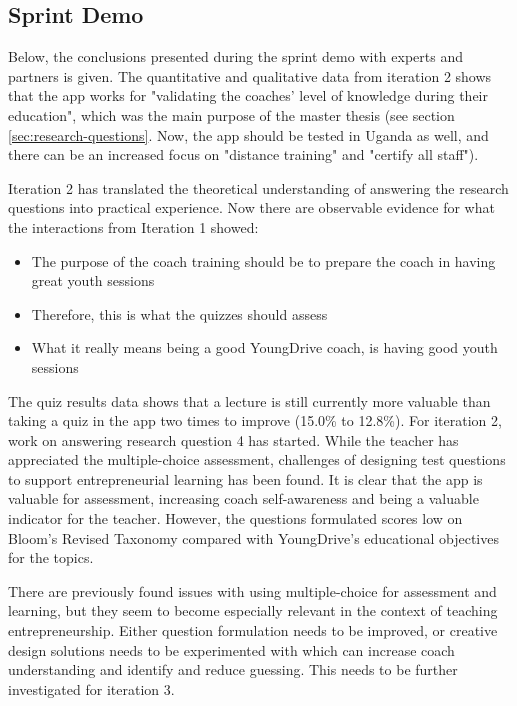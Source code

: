 \subsection{Sprint Demo}

Below, the conclusions presented during the sprint demo with experts and partners is given. The quantitative and qualitative data from iteration 2 shows that the app works for "validating the coaches' level of knowledge during their education", which was the main purpose of the master thesis (see section \ref{sec:research-questions}. Now, the app should be tested in Uganda as well, and there can be an increased focus on "distance training" and "certify all staff").

Iteration 2 has translated the theoretical understanding of answering the research questions into practical experience. Now there are observable evidence for what the interactions from Iteration 1 showed:

\begin{itemize}
\item The purpose of the coach training should be to prepare the coach in having great youth sessions
\item Therefore, this is what the quizzes should assess
\item What it really means being a good YoungDrive coach, is having good youth sessions
\end{itemize}

The quiz results data shows that a lecture is still currently more valuable than taking a quiz in the app two times to improve (15.0\% to 12.8\%). For iteration 2, work on answering research question 4 has started. While the teacher has appreciated the multiple-choice assessment, challenges of designing test questions to support entrepreneurial learning has been found. It is clear that the app is valuable for assessment, increasing coach self-awareness and being a valuable indicator for the teacher. However, the questions formulated scores low on Bloom's Revised Taxonomy \citep{krathwohl} compared with YoungDrive's educational objectives for the topics.

There are previously found issues with using multiple-choice for assessment and learning, but they seem to become especially relevant in the context of teaching entrepreneurship. Either question formulation needs to be improved, or creative design solutions needs to be experimented with which can increase coach understanding and identify and reduce guessing. This needs to be further investigated for iteration 3.

